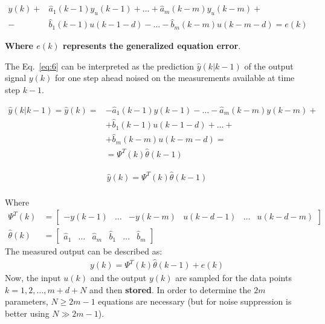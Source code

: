 \documentclass[11pt,a4paper,oneside]{book}
\numberwithin{equation}{section}
\theoremstyle{it}
\theoremstyle{definition}
\begin{document}
\begin{equation}\label{eq:6}
	\begin{aligned}
		y(k)+ & \hat{a}_{1}(k-1)y_u(k-1)+\dots+\hat{a}_{m}(k-m)y_u(k-m)+ \\[6pt]
		-&\hat{b}_{1}(k-1)u(k-1-d)-\dots-\hat{b}_{m}(k-m)u(k-m-d)=e(k)
	\end{aligned}
\end{equation}

\noindent\textbf{Where $e(k)$ represents the generalized equation error}.

The Eq.~\eqref{eq:6} can be interpreted as the prediction $\hat{y}(k|k-1)$ of 
the output signal $y(k)$ for one step ahead noised on the measurements 
available at time step $k-1$.

\begin{equation}\label{eq:7}
	\begin{aligned}
		\hat{y}(k|k-1) = \hat{y}(k) = & 
		-\hat{a}_{1}(k-1)y(k-1)-\dots-\hat{a}_{m}(k-m)y(k-m)+ \\[6pt]
		& + \hat{b}_{1}(k-1)u(k-1-d)+\dots+ \\[6pt]
		& +\hat{b}_{m}(k-m)u(k-m-d)= \\[6pt]
		&= \Psi^T(k)\hat{\theta}(k-1)
	\end{aligned}
\end{equation}

\begin{equation}\label{eq:8}
	\begin{aligned}
		\boxed{\hat{y}(k) = \Psi^T(k)\hat{\theta}(k-1)}
	\end{aligned}
\end{equation} \\
Where \\
\begin{equation}\label{eq:9}
	\begin{aligned}
		\Psi^T(k) & = 
		\begin{bmatrix}
			-y(k-1) & \dots & -y(k-m) & u(k-d-1) & \dots & u(k-d-m)
		\end{bmatrix}      \\[6pt]
		\hat{\theta}(k) & =
		\begin{bmatrix}
			\hat{a}_1 & \dots & \hat{a}_m & \hat{b}_1 & \dots &  \hat{b}_m
		\end{bmatrix} 
	\end{aligned}
\end{equation}
The measured output can be described as:
\begin{equation}\label{eq:10}
	\begin{aligned}
		\boxed{y(k) = \Psi^T(k)\hat{\theta}(k-1)+e(k)}
	\end{aligned}
\end{equation}
Now, the input $u(k)$ and the output $y(k)$ are sampled for the data points $k 
= 1,2,\dots,m+d+N$ and then \textbf{stored}. In order to determine the $2m$ 
parameters, $N\geq2m-1$ equations are necessary (but for noise suppression is 
better using $N\gg2m-1$). 
\end{document}
